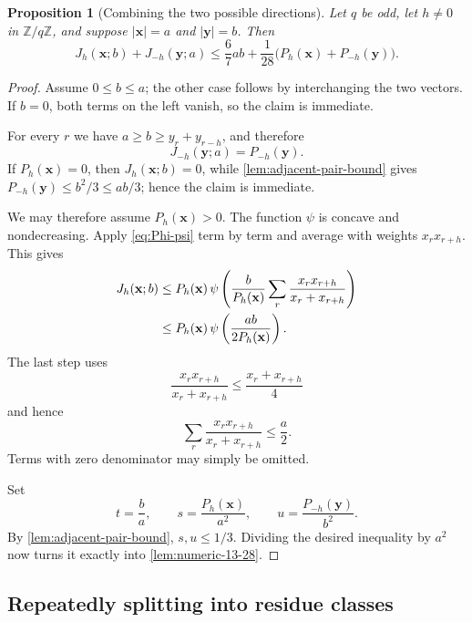 \documentclass[11pt]{article}
\numberwithin{equation}{section}
\newtheorem{proposition}[proposition]{Proposition}
\theoremstyle{remark}
\newcommand{\Fq}{\mathbb Z/q\mathbb Z}
\begin{document}
\begin{proposition}[Combining the two possible directions]
\label{prop:opposite-differences}
Let $q$ be odd, let $h\ne0$ in $\Fq$, and suppose
$|\mathbf x|=a$ and $|\mathbf y|=b$.  Then
\begin{equation}\label{eq:opposite-differences}
 J_h(\mathbf x;b)+J_{-h}(\mathbf y;a)
 \le \frac67ab
 +\frac1{28}\bigl(P_h(\mathbf x)+P_{-h}(\mathbf y)\bigr).
\end{equation}
\end{proposition}
\begin{proof}
Assume $0\le b\le a$; the other case follows by interchanging the two
vectors.  If $b=0$, both terms on the left vanish, so the claim is immediate.

For every $r$ we have $a\ge b\ge y_r+y_{r-h}$, and therefore
\begin{equation}\label{eq:large-third-set}
 J_{-h}(\mathbf y;a)=P_{-h}(\mathbf y).
\end{equation}
If $P_h(\mathbf x)=0$, then $J_h(\mathbf x;b)=0$, while
\cref{lem:adjacent-pair-bound} gives
$P_{-h}(\mathbf y)\le b^2/3\le ab/3$; hence the claim is immediate.

We may therefore assume $P_h(\mathbf x)>0$.  The function $\psi$ is concave
and nondecreasing.  Apply \eqref{eq:Phi-psi} term by term and average with
weights $x_rx_{r+h}$.  This gives
\begin{align}
 J_h(\mathbf x;b)
 &\le P_h(\mathbf x)\,
 \psi\left(
  \frac{b}{P_h(\mathbf x)}
  \sum_r\frac{x_rx_{r+h}}{x_r+x_{r+h}}
 \right)\notag\\
 &\le P_h(\mathbf x)\,
 \psi\left(\frac{ab}{2P_h(\mathbf x)}\right).
 \label{eq:cycle-Jensen}
\end{align}
The last step uses
\[
 \frac{x_rx_{r+h}}{x_r+x_{r+h}}
 \le\frac{x_r+x_{r+h}}4
\]
and hence
\[
 \sum_r\frac{x_rx_{r+h}}{x_r+x_{r+h}}\le\frac a2.
\]
Terms with zero denominator may simply be omitted.

Set
\[
 t=\frac ba,
 \qquad
 s=\frac{P_h(\mathbf x)}{a^2},
 \qquad
 u=\frac{P_{-h}(\mathbf y)}{b^2}.
\]
By \cref{lem:adjacent-pair-bound}, $s,u\le1/3$.  Dividing the desired
inequality by $a^2$ now turns it exactly into \cref{lem:numeric-13-28}.
\end{proof}

\subsection{Repeatedly splitting into residue classes}
\end{document}
